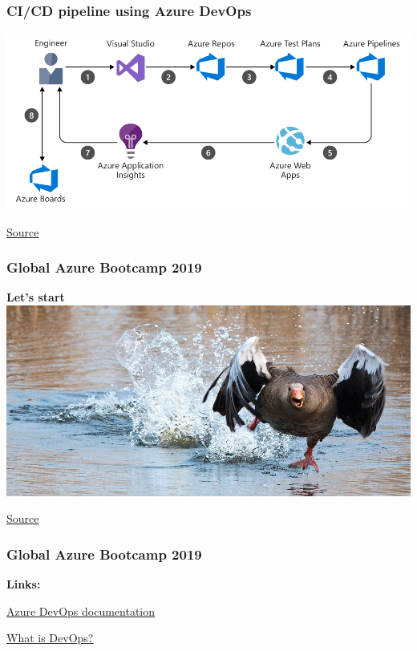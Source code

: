 \documentclass{beamer}
\def \prestitle {Global Azure Bootcamp 2019}
\newcommand{\source}[1]{
	\begin{flushright}
		\hfill {\scriptsize \href{#1}{Source}}	
	\end{flushright}
}
\begin{document}
\begin{frame}
\frametitle{CI/CD pipeline using Azure DevOps}

\includegraphics[width=\textwidth]{cicdpipeline.png} \\
\source{https://docs.microsoft.com/en-us/azure/architecture/example-scenario/apps/devops-dotnet-webapp}

\end{frame}


\begin{frame}
\frametitle{\prestitle}
\centering
\textbf{{\Huge Let's start}} \\
\vspace{5mm}
\includegraphics[width=.9\textwidth]{start.jpg}
\source{https://pixabay.com/photos/greylag-goose-goose-water-bird-wing-2139296/}
\end{frame}

\begin{frame}
\frametitle{\prestitle}

\begin{flushleft}
	\textbf{{\LARGE Links:}}	
\end{flushleft}

\begin{dinglist}{52}
	\item \href{https://docs.microsoft.com/en-us/azure/devops/?view=azure-devops}{Azure DevOps documentation}
	\item \href{https://www.atlassian.com/devops}{What is DevOps?}
\end{dinglist}

\end{frame}
\end{document}
